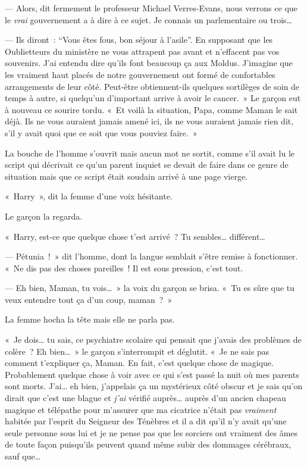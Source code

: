--- Alors, dit fermement le professeur Michael Verres-Evans, nous verrons ce que le \emph{vrai} gouvernement a à dire à ce sujet.
Je connais un parlementaire ou trois…

--- Ils diront~: “Vous êtes fous, bon séjour à l'asile”.
En supposant que les Oublietteurs du ministère ne vous attrapent pas avant et n'effacent pas vos souvenirs.
J'ai entendu dire qu'ils font beaucoup ça aux Moldus.
J'imagine que les vraiment haut placés de notre gouvernement ont formé de confortables arrangements de leur côté.
Peut-être obtiennent-ils quelques sortilèges de soin de temps à autre, si quelqu'un d'important arrive à avoir le cancer.~»
Le garçon eut à nouveau ce sourire tordu.
«~Et voilà la situation, Papa, comme Maman le sait déjà.
Ils ne vous auraient jamais amené ici, ils ne vous auraient jamais rien dit, s'il y avait quoi que ce soit que vous pouviez faire.~»

La bouche de l'homme s'ouvrit mais aucun mot ne sortit, comme s'il avait lu le script qui décrivait ce qu'un parent inquiet se devait de faire dans ce genre de situation mais que ce script était soudain arrivé à une page vierge.

«~Harry~», dit la femme d'une voix hésitante.

Le garçon la regarda.

«~Harry, est-ce que quelque chose t'est arrivé~?
Tu sembles… différent…

--- Pétunia~!~»
dit l'homme, dont la langue semblait s'être remise à fonctionner.
«~Ne dis pas des choses pareilles~!
Il est sous pression, c'est tout.

--- Eh bien, Maman, tu vois…~»
la voix du garçon se brisa.
«~Tu es sûre que tu veux entendre tout ça d'un coup, maman~?~»

La femme hocha la tête mais elle ne parla pas.

«~Je dois… tu sais, ce psychiatre scolaire qui pensait que j'avais des problèmes de colère~?
Eh bien…~»
le garçon s'interrompit et déglutit.
«~Je ne sais pas comment t'expliquer ça, Maman.
En fait, c'est quelque chose de magique.
Probablement quelque chose à voir avec ce qui s'est passé la nuit où mes parents sont morts.
J'ai… eh bien, j'appelais ça un mystérieux côté obscur et je sais qu'on dirait que c'est une blague et \emph{j'ai} vérifié auprès… auprès d'un ancien chapeau magique et télépathe pour m'assurer que ma cicatrice n'était pas \emph{vraiment} habitée par l'esprit du Seigneur des Ténèbres et il a dit qu'il n'y avait qu'une seule personne sous lui et je ne pense pas que les sorciers ont vraiment des âmes de toute façon puisqu'ils peuvent quand même subir des dommages cérébraux, sauf que…

